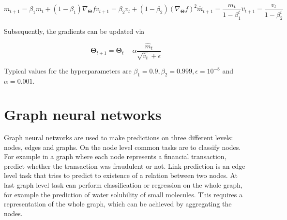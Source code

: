 \begin{subequations}
	\begin{equation}
		m_{t+1} = \beta_1 m_t + (1 - \beta_1) \nabla_{\pmb{\Theta}} f
	\end{equation}
	\begin{equation}
		v_{t+1} = \beta_2 v_t + (1 - \beta_2) \left( \nabla_{\pmb{\Theta}} f \right)^2
	\end{equation}
	\begin{equation}
		\hat{m}_{t+1} = \frac{m_t}{1 - \beta^t_1}
	\end{equation}
	\begin{equation}
		\hat{v}_{t+1} = \frac{v_t}{1 - \beta^t_2}
	\end{equation}
\end{subequations}


Subsequently, the gradients can be updated via


\begin{equation}
	\pmb{\Theta}_{t+1} = \pmb{\Theta}_t - \alpha \frac{\hat{m}_t}{\sqrt{\hat{v}_t} + \epsilon}
\end{equation}


Typical values for the hyperparameters are $\beta_1 = 0.9, \beta_2 = 0.999, \epsilon = 10^{-8}$
and $\alpha = 0.001$.


\section{Graph neural networks}


Graph neural networks are used to make predictions on three different levels:
nodes, edges and graphs. On the node level common tasks are to classify nodes.
For example in a graph where each node represents a financial transaction, predict
whether the transaction was fraudulent or not. Link prediction is an edge level
task that tries to predict to existence of a relation between two nodes. At last
graph level task can perform classification or regression on the whole graph, for
example the prediction of water solubility of small molecules.\cite{wu2020comprehensive}
This requires a representation of the whole graph, which can be achieved by 
aggregating the nodes.\cite{gilmer2017neural}


